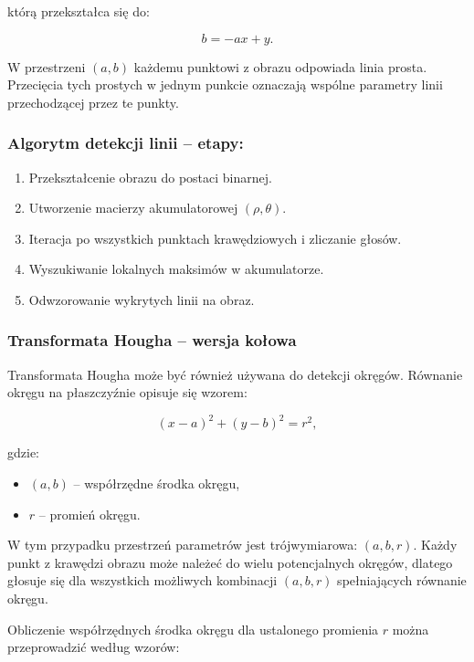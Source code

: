 którą przekształca się do:

\begin{equation}
	b = -ax + y.
\end{equation}

W przestrzeni $(a, b)$ każdemu punktowi z obrazu odpowiada linia prosta. Przecięcia tych prostych w jednym punkcie oznaczają wspólne parametry linii przechodzącej przez te punkty.

\subsubsection*{Algorytm detekcji linii – etapy:}
\begin{enumerate}
	\item Przekształcenie obrazu do postaci binarnej.
	\item Utworzenie macierzy akumulatorowej $(\rho, \theta)$.
	\item Iteracja po wszystkich punktach krawędziowych i zliczanie głosów.
	\item Wyszukiwanie lokalnych maksimów w akumulatorze.
	\item Odwzorowanie wykrytych linii na obraz.
\end{enumerate}

\subsubsection{Transformata Hougha – wersja kołowa}

Transformata Hougha może być również używana do detekcji okręgów. Równanie okręgu na płaszczyźnie opisuje się wzorem:

\begin{equation}
	(x - a)^2 + (y - b)^2 = r^2,
\end{equation}

gdzie:
\begin{itemize}
	\item $(a, b)$ – współrzędne środka okręgu,
	\item $r$ – promień okręgu.
\end{itemize}

W tym przypadku przestrzeń parametrów jest trójwymiarowa: $(a, b, r)$. Każdy punkt z krawędzi obrazu może należeć do wielu potencjalnych okręgów, dlatego głosuje się dla wszystkich możliwych kombinacji $(a, b, r)$ spełniających równanie okręgu.

Obliczenie współrzędnych środka okręgu dla ustalonego promienia $r$ można przeprowadzić według wzorów:

